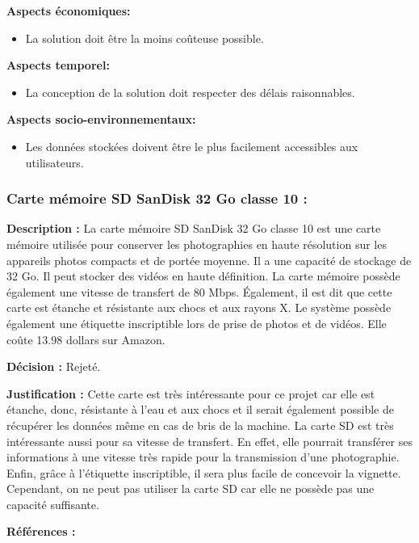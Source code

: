 \textbf{Aspects économiques:}
\begin{itemize} [label = {--}]
    \item La solution doit être la moins coûteuse possible.
\end{itemize}

\textbf{Aspects temporel:}
\begin{itemize} [label = {--}]
    \item La conception de la solution doit respecter des délais raisonnables.
\end{itemize}

\textbf{Aspects socio-environnementaux:}
\begin{itemize} [label = {--}]
    \item Les données stockées doivent être le plus facilement accessibles aux utilisateurs.
\end{itemize}

\subsubsection{Carte mémoire SD SanDisk 32 Go classe 10 :}

\textbf{Description :} La carte mémoire SD SanDisk 32 Go classe 10 est une carte mémoire utilisée pour conserver les photographies en haute résolution sur les appareils photos compacts et de portée moyenne. Il a une capacité de stockage de 32 Go. Il peut stocker des vidéos en haute définition. La carte mémoire possède également une vitesse de transfert de 80 Mbps. Également, il est dit que cette carte est étanche et résistante aux chocs et aux rayons X. Le système possède également une étiquette inscriptible lors de prise de photos et de vidéos. Elle coûte 13.98 dollars sur Amazon.

\textbf{Décision :} Rejeté.

\textbf{Justification :} Cette carte est très intéressante pour ce projet car elle est étanche, donc, résistante à l’eau et aux chocs et il serait également possible de récupérer les données même en cas de bris de la machine. La carte SD est très intéressante aussi pour sa vitesse de transfert. En effet, elle pourrait transférer ses informations à une vitesse très rapide pour la transmission d’une photographie. Enfin, grâce à l’étiquette inscriptible, il sera plus facile de concevoir la vignette. Cependant, on ne peut pas utiliser la carte SD car elle ne possède pas une capacité suffisante.

\textbf{Références :} \cite{casd} \cite{amsd}

